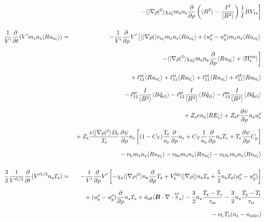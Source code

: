 \documentclass[11pt]{article}
\def\bvec#1{\leavevmode\hbox{\boldmath$#1$}}
\let\vec=\bvec
\def\r#1{{\rm#1}}
\def\aves#1{\langle#1\rangle}
\def\dd#1#2{\frac{\partial #1}{\partial #2}}
\def\tensor#1{\mathord{\displaystyle\mathop{#1}^\leftrightarrow}}
\def\para{\parallel}
\def\ddrho{\frac{\partial}{\partial\rho}}
\def\ddt{\frac{\partial}{\partial t}}
\def\mz{m_\r{z}}
\def\nee{n_\r{e}}
\def\nz{n_\r{z}}
\def\Te{T_\r{e}}
\def\Ti{T_\r{i}}
\def\Tz{T_\r{z}}
\def\Zz{Z_\r{z}}
\def\uzt#1{u_{\r{#1}\zeta}}
\def\uhatth#1{\hat{u}_{\r{#1}\theta}}
\def\qhatpara#1{\hat{q}_{\r{#1}\para}}
\def\urho#1{u_\r{#1}^\rho}
\def\ugrho{u_{g}^\rho}
\def\chis#1{\chi_\r{#1}}
\def\De{D_\r{e}}
\def\nun#1{\nu_\r{0#1}}
\def\ndiv#1{n_\r{#1div}}
\def\nuL{\nu_\r{L}}
\def\nuOL{\nu_\r{OL}}
\begin{document}
\begin{eqnarray}
\nonumber\\[3mm]&&{}
    \left.- \aves{|\nabla\rho|^2} \chis{z\zeta} \mz \nz
          \ddrho \left(\aves{R^2} - \frac{I^2}{\aves{B^2}}\right) \frac{1}{I}BV_{1\r{z}}\right]
\\[5mm]
 \frac{1}{V'} \ddt (V' \mz \nz \aves{R \uzt{z}}) &=&
%
  - \frac{1}{V'} \ddrho V' \left[  \aves{|\nabla\rho|} v_{\r{z}\zeta} \mz \nz \aves{R \uzt{z}}
			       +   (\urho{z} - \ugrho) \mz \nz \aves{R \uzt{z}} \right.
\nonumber\\[3mm]&&{}
                        \left. - \aves{|\nabla\rho|^2} \chis{z\zeta} \mz \nz
			         \ddrho \aves{R \uzt{z}}
                               + \aves{\Pi_\r{z}^\r{res}} \right]
\nonumber\\[3mm]&&{}
%
  + \ell_{11}^\r{ze} \aves{R \uzt{e}}
  + \ell_{11}^\r{zi} \aves{R \uzt{i}}
  + \ell_{11}^\r{zz} \aves{R \uzt{z}}
  + \ell_{11}^\r{zb} \aves{R \uzt{b}}
\nonumber\\[2.5mm]&&{}
%
  - \ell_{12}^\r{ze} \frac{I}{\aves{B^2}} \aves{B \qhatpara{e}}
  - \ell_{12}^\r{zi} \frac{I}{\aves{B^2}} \aves{B \qhatpara{i}}
  - \ell_{12}^\r{zz} \frac{I}{\aves{B^2}} \aves{B \qhatpara{z}}
\nonumber\\[2.5mm]&&{}
%
  + \Zz e                 \nz \aves{R E_\zeta}
%
  + \Zz e \dd{\psi}{\rho} \nz \urho{z}
%
\nonumber\\[2.5mm]&&{}
%
%
  + \Zz \frac{e \aves{|\nabla\rho|^2} \De}{\Te} \dd{\psi}{\rho} \nz
    \left[  (1-C_\r{T})\frac{\Te}{\nee}\ddrho \nee
           + C_\r{T} \frac{1}{\nee} \ddrho \nee\Te
	  + \Te \dd{\psi}{\rho} C_\r{p} \right]
\nonumber\\[2.5mm]&&{}
%
  - \nuL    \mz \nz \aves{R \uzt{z}}
%
  - \nun{z} \mz \nz \aves{R \uzt{z}}
%
  - \nuOL   \mz \nz \aves{R \uzt{z}}
\\[5mm]
 \frac{3}{2}\frac{1}{V'^{5/3}} \ddt (V'^{5/3} \nz \Tz ) &=& 
%
  - \frac{1}{V'} \ddrho V'
    \left[ - \chis{z}          \aves{|\nabla\rho|^2} \nz \ddrho \Tz
           + V_\r{z}^\r{hp} \aves{|\nabla\rho|}   \nz \Tz
           + \frac{5}{2} \nz \Tz ( \urho{z} - \ugrho ) \right]
\nonumber\\[2.5mm]&&{}
%
  + ( \urho{z} - \ugrho ) \ddrho \nz \Tz
%
  + \uhatth{z} \aves{\vec{B}\cdot\nabla\cdot\tensor{\pi}_\r{z}}
%
  - \frac{3}{2} \nz \frac{ \Tz - \Te }{\tau_\r{ze}}
  - \frac{3}{2} \nz \frac{ \Tz - \Ti }{\tau_\r{zi}}
\nonumber\\[2.5mm]&&{}
%
  - \nuL \Tz (\nz - \ndiv{z})

\end{eqnarray}
\end{document}
